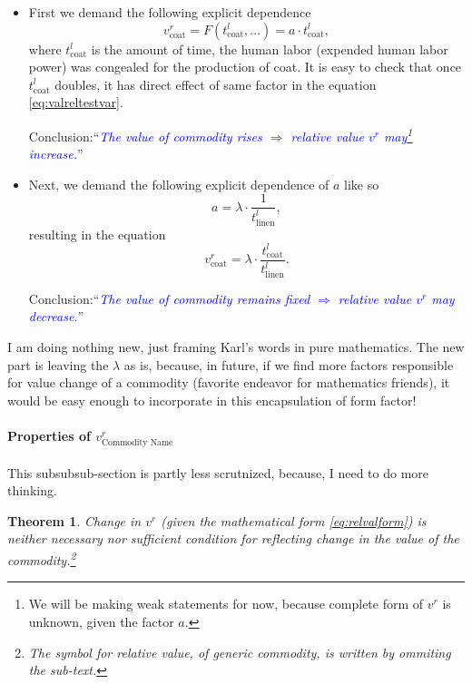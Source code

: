 \documentclass[12pt]{extarticle}
\newtheorem{theorem}{Theorem}[section]
\theoremstyle{definition}
\begin{document}
\begin{itemize}
\item First we demand the following explicit dependence
  \begin{equation}
  v_{\text{coat}}^{r} = F(t_{\text{coat}}^l, \ldots) = a\cdot t_{\text{coat}}^l, 
\end{equation}
where $t_{\text{coat}}^l$ is the amount of time, the human labor (expended human labor power) was congealed for the production of coat.
It is easy to check that once $t_{\text{coat}}^l$ doubles, it has direct effect of same factor in the equation \ref{eq:valreltestvar}.

Conclusion:``\emph{\textcolor{blue}{The value of commodity rises $\Rightarrow$ relative value $v^r$ may\footnote{We will be making weak statements for now, because complete form of $v^r$ is unknown, given the factor $a$.} increase.}}''

\item Next, we demand the following explicit dependence of $a$ like so
  \begin{equation}
    \label{eq:adep}
    a = \lambda\cdot\frac{1}{t_{\text{linen}}^l},
  \end{equation}
  resulting in the equation
  \begin{equation}
    \label{eq:relvalform}
     v_{\text{coat}}^{r} = \lambda \cdot \frac{t_{\text{coat}}^l}{t_{\text{linen}}^l}.
   \end{equation}
   
   Conclusion:``\emph{\textcolor{blue}{The value of commodity remains fixed $\Rightarrow$ relative value $v^r$ may decrease.}}''
 \end{itemize}
 I am doing nothing new, just framing Karl's words in pure mathematics.  The new part is leaving the $\lambda$ as is, because, in future, if we find more factors responsible for value change of a commodity (favorite endeavor for mathematics friends), it would be easy enough to incorporate in this encapsulation of form factor!

 \paragraph{Properties of $v_{\text{Commodity Name}}^{r}$}
 This subsubsub-section is partly less scrutnized, because, I need to do more thinking.

 \begin{theorem}
   \label{th:relvalandval}
 Change in $v^{r}$ (given the mathematical form \ref{eq:relvalform}) is neither necessary nor sufficient condition for reflecting change in the value of the commodity.\footnote{The symbol for relative value, of generic commodity, is written by ommiting the sub-text.}
 \end{theorem}
\end{document}
